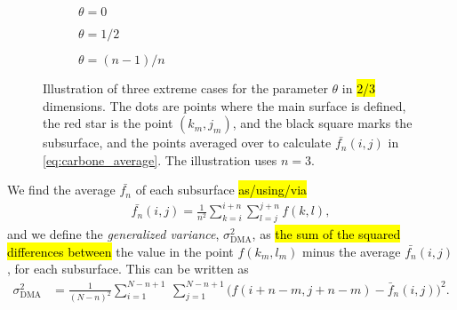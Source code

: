 \begin{figure}[htpb]%
    \centering%
    \begin{subfigure}[b]{0.25\textwidth}%
        \caption{$\theta = 0$}%
        \label{fig:DMA_theta_a}%
    \end{subfigure}%
    \hspace{0.1\textwidth}%
    \begin{subfigure}[b]{0.25\textwidth}%
        \caption{$\theta = 1/2$}%
        \label{fig:DMA_theta_b}%
    \end{subfigure}%
    \hspace{0.1\textwidth}%
    \begin{subfigure}[b]{0.25\textwidth}%
        \caption{$\theta = (n-1)/n$}%
        \label{fig:DMA_theta_c}%
    \end{subfigure}%
        \caption{%
        Illustration of three extreme cases for the parameter $\theta$ in \hl{2/3} dimensions. The dots are points where the main surface is defined, the red star is the point $(k_m,j_m)$, and the black square marks the subsurface, and the points averaged over to calculate $\bar {f_n}(i,j)$ in \cref{eq:carbone_average}. The illustration uses $n = 3$.%
        \label{fig:DMA_theta}%
    }%
\end{figure}%

We find the average $\bar {f_n}$ of each subsurface \hl{as/using/via}
\begin{align}
    \bar {f_n}(i,j) = \frac{1}{n^2} \sum_{k = i}^{i+n} \sum_{l = j}^{j+n} f(k,l),
    \label{eq:carbone_average}
\end{align}
and we define the \emph{generalized variance}, $\sigma_\text{DMA}^2$, as \hl{the sum of the squared differences between} the value in the point $f(k_m,l_m)$ minus the average $\bar {f_n}(i,j)$, for each subsurface. This can be written as
\begin{align}
    \sigma_\text{DMA}^2 
    &= \frac{1}{(N-n)^2}\sum_{i=1}^{N-n+1} ~ \sum_{j=1}^{N-n+1} 
    \big(
        f(i+n-m,j+n-m) - \bar f_n(i,j)
    \big)^2.\label{eq:dma_variance}
\end{align}

